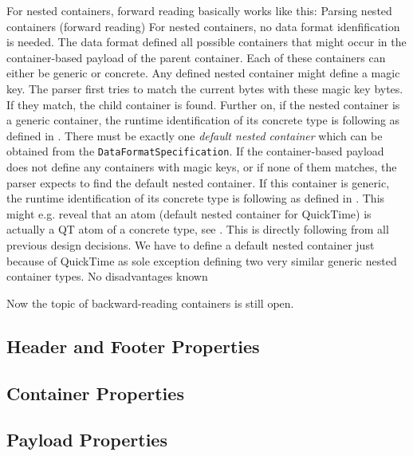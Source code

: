 For nested containers, forward reading basically works like this:
{%
Parsing nested containers (forward reading)
}
{%
For nested containers, no data format idenfification is needed. The data format defined all possible containers that might occur in the container-based payload of the parent container. Each of these containers can either be generic or concrete. Any defined nested container might define a magic key. The parser first tries to match the current bytes with these magic key bytes. If they match, the child container is found. Further on, if the nested container is a generic container, the runtime identification of its concrete type is following as defined in . There must be exactly one \emph{default nested container} which can be obtained from the \texttt{DataFormatSpecification}. If the container-based payload does not define any containers with magic keys, or if none of them matches, the parser expects to find the default nested container. If this container is generic, the runtime identification of its concrete type is following as defined in . This might e.g. reveal that an atom (default nested container for QuickTime) is actually a QT atom of a concrete type, see .
}
{%
This is directly following from all previous design decisions. We have to define a default nested container just because of QuickTime as sole exception defining two very similar generic nested container types.
}
{%
No disadvantages known
}

Now the topic of backward-reading containers is still open.


\subsection{Header and Footer Properties}%
\label{sec:HeaderProperties}%


\subsection{Container Properties}%
\label{sec:ContainerProperties}%


\subsection{Payload Properties}%
\label{sec:PayloadProperties}%


